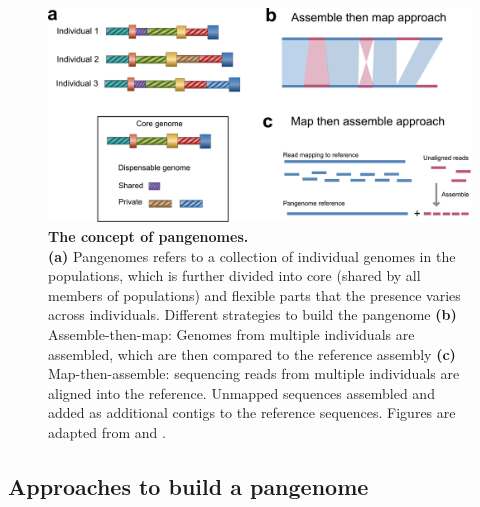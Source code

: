 \documentclass[../main.tex]{subfiles}
\begin{document}
\begin{figure}[!htb]
    \centering
    \includegraphics[width=\textwidth]{intro/fig3.pdf}
        \vspace{3mm}
        \caption[The concept of pangenomes]{\textbf{The concept of pangenomes.} \\
        \footnotesize{\textbf{(a)} Pangenomes refers to a collection of individual genomes in the populations, which is further divided into core (shared by all members of populations) and flexible parts that the presence varies across individuals. Different strategies to build the pangenome \textbf{(b)} Assemble-then-map: Genomes from multiple individuals are assembled, which are then compared to the reference assembly \textbf{(c)} Map-then-assemble: sequencing reads from multiple individuals are aligned into the reference. Unmapped sequences assembled and added as additional contigs to the reference sequences. Figures are adapted from \citep{sherman2020pan} and \citep{bayer2020plant}.}}
        \label{fig13:pan}
\end{figure}


\subsection{Approaches to build a pangenome}
\end{document}
